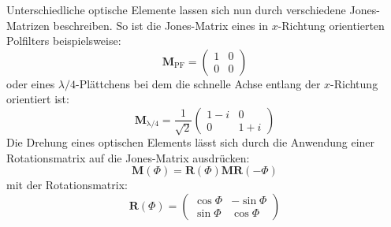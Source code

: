 \documentclass[titlepage,  ngerman]{article}
\begin{document}
	Unterschiedliche optische Elemente lassen sich nun durch verschiedene Jones-Matrizen beschreiben. So ist die Jones-Matrix eines in $x$-Richtung orientierten Polfilters beispielsweise:
	\begin{equation}
		\boldsymbol{M}_{\mathrm{PF}} = \begin{pmatrix}
			1 & 0 \\
			0 & 0
		\end{pmatrix}
	\end{equation}
	oder eines $\lambda / 4$-Plättchens bei dem die schnelle Achse entlang der $x$-Richtung orientiert ist:	
	\begin{equation}
		\boldsymbol{M}_{\mathrm{\lambda / 4}} = \dfrac{1}{\sqrt{2}}\begin{pmatrix}
			1-i & 0 \\
			0 & 1+i
		\end{pmatrix}
	\end{equation}
	Die Drehung eines optischen Elements lässt sich durch die Anwendung einer Rotationsmatrix auf die Jones-Matrix ausdrücken:
	\begin{equation}
		\boldsymbol{M}(\Phi) = \boldsymbol{R}(\Phi)\boldsymbol{M}\boldsymbol{R}(-\Phi)
	\end{equation}
	mit der Rotationsmatrix:
	\begin{equation}
		\boldsymbol{R}(\Phi) = \begin{pmatrix}
			\cos\Phi & - \sin\Phi \\
			\sin\Phi & \cos\Phi
		\end{pmatrix}
	\end{equation}
\end{document}
